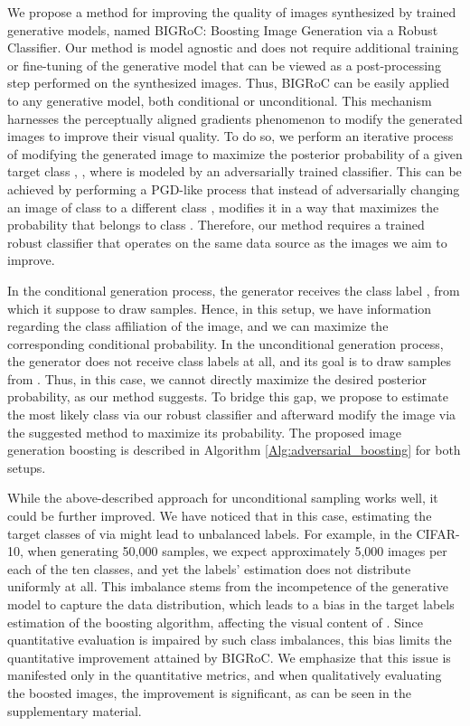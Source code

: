 \documentclass[10pt]{article} \usepackage[accepted]{tmlr}
\begin{document}
We propose a method for improving the quality of images synthesized by trained generative models, named BIGRoC: Boosting Image Generation via a Robust Classifier.
Our method is model agnostic and does not require additional training or fine-tuning of the generative model that can be viewed as a post-processing step performed on the synthesized images.
Thus, BIGRoC can be easily applied to any generative model, both conditional or unconditional.
This mechanism harnesses the perceptually aligned gradients phenomenon to modify the generated images to improve their visual quality.
To do so, we perform an iterative process of modifying the generated image  to maximize the posterior probability of a given target class , , where  is modeled by an adversarially trained classifier.
This can be achieved by performing a PGD-like process that instead of adversarially changing an image  of class  to a different class , modifies it in a way that maximizes the probability that  belongs to class .
Therefore, our method requires a trained robust classifier that operates on the same data source as the images we aim to improve.

In the conditional generation process, the generator  receives the class label , from which it suppose to draw samples. 
Hence, in this setup, we have information regarding the class affiliation of the image, and we can maximize the corresponding conditional probability.
In the unconditional generation process, the generator does not receive class labels at all, and its goal is to draw samples from .
Thus, in this case, we cannot directly maximize the desired posterior probability, as our method suggests.
To bridge this gap, we propose to estimate the most likely class via our robust classifier  and afterward modify the image via the suggested method to maximize its probability.
The proposed image generation boosting is described in Algorithm \ref{Alg:adversarial_boosting} for both setups.

While the above-described approach for unconditional sampling works well, it could be further improved. We have noticed that in this case, estimating the target classes  of  via  might lead to unbalanced labels.
For example, in the CIFAR-10, when generating 50,000 samples, we expect approximately 5,000 images per each of the ten classes, and yet the labels' estimation does not distribute uniformly at all.
This imbalance stems from the incompetence of the generative model to capture the data distribution, which leads to a bias in the target labels estimation of the boosting algorithm, affecting the visual content of . Since quantitative evaluation is impaired by such class imbalances, this bias limits the quantitative improvement attained by BIGRoC.
We emphasize that this issue is manifested only in the quantitative metrics, and when qualitatively evaluating the boosted images, the improvement is significant, as can be seen in the supplementary material.
\end{document}
